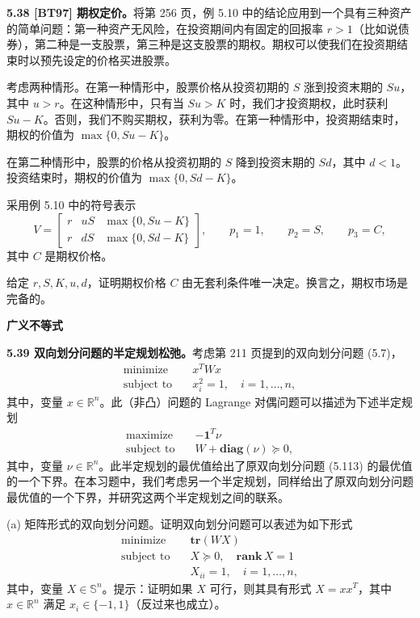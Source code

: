 \documentclass[UTF8,12pt,a4paper,fontset=fandol]{ctexart}
\begin{document}
\noindent\textbf{5.38 [BT97] 期权定价。}\quad 将第 256 页，例 5.10 中的结论应用到一个具有三种资产的简单问题：第一种资产无风险，在投资期间内有固定的回报率 $r>1$（比如说债券），第二种是一支股票，第三种是这支股票的期权。期权可以使我们在投资期结束时以预先设定的价格买进股票。

考虑两种情形。在第一种情形中，股票价格从投资初期的 $S$ 涨到投资末期的 $Su$，其中 $u>r$。在这种情形中，只有当 $Su>K$ 时，我们才投资期权，此时获利 $Su-K$。否则，我们不购买期权，获利为零。在第一种情形中，投资期结束时，期权的价值为 $\max\{0,Su-K\}$。

在第二种情形中，股票的价格从投资初期的 $S$ 降到投资末期的 $Sd$，其中 $d<1$。投资结束时，期权的价值为 $\max\{0,Sd-K\}$。

采用例 5.10 中的符号表示
\[
V=
\begin{bmatrix}
r & uS & \max\{0,Su-K\}\\
r & dS & \max\{0,Sd-K\}
\end{bmatrix},\qquad p_1=1,\qquad p_2=S,\qquad p_3=C,
\]
其中 $C$ 是期权价格。

给定 $r,S,K,u,d$，证明期权价格 $C$ 由无套利条件唯一决定。换言之，期权市场是完备的。

\noindent\textbf{广义不等式}

\noindent\textbf{5.39 双向划分问题的半定规划松弛。}\quad 考虑第 211 页提到的双向划分问题 (5.7)，
\begin{equation}
\begin{aligned}
\text{minimize}\quad & x^TWx\\
\text{subject to}\quad & x_i^2=1,\quad i=1,\ldots,n,
\end{aligned}
\tag{5.113}
\end{equation}
其中，变量 $x\in\mathbb{R}^n$。此（非凸）问题的 Lagrange 对偶问题可以描述为下述半定规划
\begin{equation}
\begin{aligned}
\text{maximize}\quad & -\mathbf{1}^T\nu\\
\text{subject to}\quad & W+\mathbf{diag}(\nu)\succeq 0,
\end{aligned}
\tag{5.114}
\end{equation}
其中，变量 $\nu\in\mathbb{R}^n$。此半定规划的最优值给出了原双向划分问题 (5.113) 的最优值的一个下界。在本习题中，我们考虑另一个半定规划，同样给出了原双向划分问题最优值的一个下界，并研究这两个半定规划之间的联系。

(a) 矩阵形式的双向划分问题。证明双向划分问题可以表述为如下形式
\[
\begin{aligned}
\text{minimize}\quad & \mathbf{tr}(WX)\\
\text{subject to}\quad & X\succeq 0,\quad \mathbf{rank}\,X=1\\
& X_{ii}=1,\quad i=1,\ldots,n,
\end{aligned}
\]
其中，变量 $X\in\mathbb{S}^n$。提示：证明如果 $X$ 可行，则其具有形式 $X=xx^T$，其中 $x\in\mathbb{R}^n$ 满足 $x_i\in\{-1,1\}$（反过来也成立）。
\end{document}
